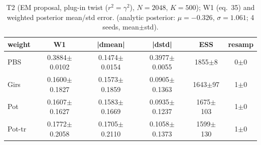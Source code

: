 \begin{table}[ht]
\centering
\caption{T2 (EM proposal, plug-in twist ($r^2=\gamma^2$), $N=2048$, $K=500$); W1 (eq.~35) and weighted posterior mean/std error. (analytic posterior: $\mu=-0.326$, $\sigma=1.061$; 4 seeds, mean$\pm$std).}
\label{tab:toy_t2_em}
\begin{tabular}{lccccc}
\toprule
weight & W1 & |dmean| & |dstd| & ESS & resamp \\
\midrule
PBS & 0.3884$\pm$0.0102 & 0.1474$\pm$0.0154 & 0.3977$\pm$0.0055 & 1855$\pm$8 & 0$\pm$0 \\
Girs & 0.1600$\pm$0.1827 & 0.1573$\pm$0.1859 & 0.0905$\pm$0.1363 & 1643$\pm$97 & 1$\pm$0 \\
Pot & 0.1607$\pm$0.1627 & 0.1583$\pm$0.1669 & 0.0935$\pm$0.1237 & 1675$\pm$103 & 1$\pm$0 \\
Pot-tr & 0.1772$\pm$0.2058 & 0.1705$\pm$0.2110 & 0.1058$\pm$0.1373 & 1599$\pm$130 & 1$\pm$0 \\
\bottomrule
\end{tabular}
\end{table}
